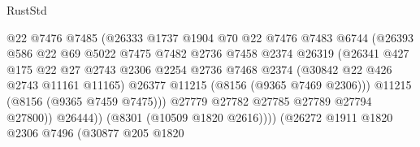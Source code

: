 \begin{lexlean}{RustStd}
\begin{coremodule}
                                      @22
                                      @7476
                                      @7485
                                      (@26333
                                        @1737
                                        @1904
                                        @70
                                        @22
                                        @7476
                                        @7483
                                        @6744
                                        (@26393
                                          @586
                                          @22
                                          @69
                                          @5022
                                          @7475
                                          @7482
                                          @2736
                                          @7458
                                          @2374
                                          @26319
                                          (@26341
                                            @427
                                            @175
                                            @22
                                            @27
                                            @2743
                                            @2306
                                            @2254
                                            @2736
                                            @7468
                                            @2374
                                            (@30842 @22 @426 @2743 @11161 @11165)
                                            @26377
                                            @11215
                                            (@8156 (@9365 @7469 @2306)))
                                          @11215
                                          (@8156 (@9365 @7459 @7475)))
                                        @27779
                                        @27782
                                        @27785
                                        @27789
                                        @27794
                                        @27800))
                                    @26444))
                                (@8301 (@10509 @1820 @2616))))
                            (@26272
                              @1911
                              @1820
                              @2306
                              @7496
                              (@30877
                                @205
                                @1820

\end{coremodule}
\end{lexlean}
